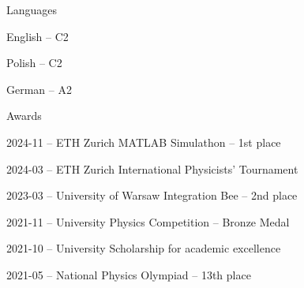 \documentclass{./cv}
\begin{document}
\begin{cvsection}{Languages}
    \begin{horizontallist}
        \item English -- C2
        \item Polish -- C2
        \item German -- A2
    \end{horizontallist}
\end{cvsection}
\begin{cvsection}{Awards}
    \begin{verticallist}
        \item[2024-11 --] ETH Zurich MATLAB Simulathon -- 1st place
        \item[2024-03 --] ETH Zurich International Physicists’ Tournament
        \item[2023-03 --] University of Warsaw Integration Bee -- 2nd place
        \item[2021-11 --] University Physics Competition -- Bronze Medal
        \item[2021-10 --] University Scholarship for academic excellence
        \item[2021-05 --] National Physics Olympiad -- 13th place
    \end{verticallist}
\end{cvsection}
\end{document}
